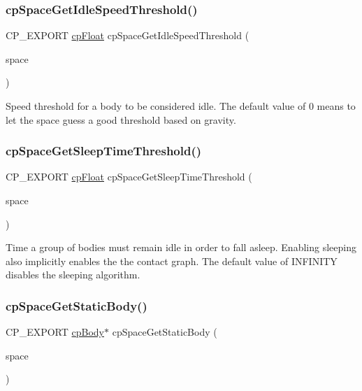 \subsubsection{\texorpdfstring{cp\+Space\+Get\+Idle\+Speed\+Threshold()}{cpSpaceGetIdleSpeedThreshold()}}
{\footnotesize\ttfamily C\+P\+\_\+\+E\+X\+P\+O\+RT \mbox{\hyperlink{group__basic_types_gac1ed65573e035bf892505768c852d8d3}{cp\+Float}} cp\+Space\+Get\+Idle\+Speed\+Threshold (\begin{DoxyParamCaption}\item[{const \mbox{\hyperlink{structcp_space}{cp\+Space}} $\ast$}]{space }\end{DoxyParamCaption})}

Speed threshold for a body to be considered idle. The default value of 0 means to let the space guess a good threshold based on gravity. \mbox{\label{group__cp_space_gab3f74ae04501ce532913c87e5be54a80}} 
\subsubsection{\texorpdfstring{cp\+Space\+Get\+Sleep\+Time\+Threshold()}{cpSpaceGetSleepTimeThreshold()}}
{\footnotesize\ttfamily C\+P\+\_\+\+E\+X\+P\+O\+RT \mbox{\hyperlink{group__basic_types_gac1ed65573e035bf892505768c852d8d3}{cp\+Float}} cp\+Space\+Get\+Sleep\+Time\+Threshold (\begin{DoxyParamCaption}\item[{const \mbox{\hyperlink{structcp_space}{cp\+Space}} $\ast$}]{space }\end{DoxyParamCaption})}

Time a group of bodies must remain idle in order to fall asleep. Enabling sleeping also implicitly enables the the contact graph. The default value of I\+N\+F\+I\+N\+I\+TY disables the sleeping algorithm. \mbox{\label{group__cp_space_ga7be14c417e01cd5c17561dd176bf93e1}} 
\subsubsection{\texorpdfstring{cp\+Space\+Get\+Static\+Body()}{cpSpaceGetStaticBody()}}
{\footnotesize\ttfamily C\+P\+\_\+\+E\+X\+P\+O\+RT \mbox{\hyperlink{structcp_body}{cp\+Body}}$\ast$ cp\+Space\+Get\+Static\+Body (\begin{DoxyParamCaption}\item[{const \mbox{\hyperlink{structcp_space}{cp\+Space}} $\ast$}]{space }\end{DoxyParamCaption})}


